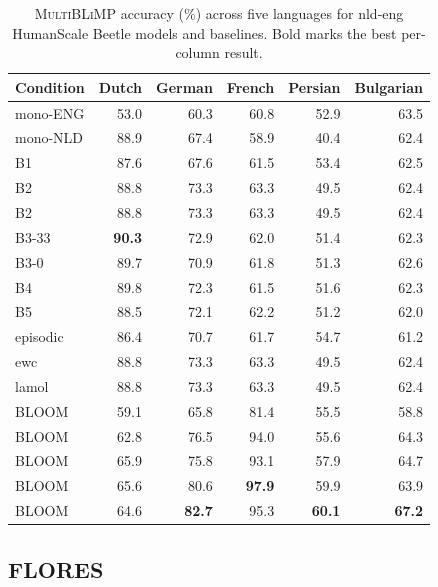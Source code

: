 \begin{table}[t]
  \centering
  \small
  \caption{\textsc{MultiBLiMP} accuracy (\%) across five languages for
           nld-eng HumanScale Beetle models and baselines.
           Bold marks the best per-column result.}
  \label{tab:multiblimp}
  \begin{tabular}{lrrrrr}
    \toprule
    Condition & Dutch & German & French & Persian & Bulgarian \\
    \midrule
    mono-ENG & 53.0 & 60.3 & 60.8 & 52.9 & 63.5 \\
    mono-NLD & 88.9 & 67.4 & 58.9 & 40.4 & 62.4 \\
    B1 & 87.6 & 67.6 & 61.5 & 53.4 & 62.5 \\
    B2 & 88.8 & 73.3 & 63.3 & 49.5 & 62.4 \\
    B2 & 88.8 & 73.3 & 63.3 & 49.5 & 62.4 \\
    B3-33 & \textbf{90.3} & 72.9 & 62.0 & 51.4 & 62.3 \\
    B3-0 & 89.7 & 70.9 & 61.8 & 51.3 & 62.6 \\
    B4 & 89.8 & 72.3 & 61.5 & 51.6 & 62.3 \\
    B5 & 88.5 & 72.1 & 62.2 & 51.2 & 62.0 \\
    episodic & 86.4 & 70.7 & 61.7 & 54.7 & 61.2 \\
    ewc & 88.8 & 73.3 & 63.3 & 49.5 & 62.4 \\
    lamol & 88.8 & 73.3 & 63.3 & 49.5 & 62.4 \\
    BLOOM & 59.1 & 65.8 & 81.4 & 55.5 & 58.8 \\
    BLOOM & 62.8 & 76.5 & 94.0 & 55.6 & 64.3 \\
    BLOOM & 65.9 & 75.8 & 93.1 & 57.9 & 64.7 \\
    BLOOM & 65.6 & 80.6 & \textbf{97.9} & 59.9 & 63.9 \\
    BLOOM & 64.6 & \textbf{82.7} & 95.3 & \textbf{60.1} & \textbf{67.2} \\
    \bottomrule
  \end{tabular}
\end{table}


\subsection{FLORES}


